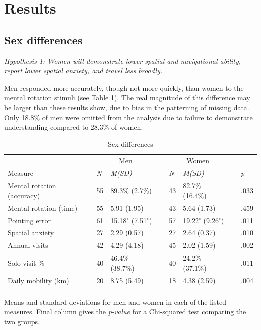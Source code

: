\section{Results}
\label{sec:3}
	\subsection{Sex differences}
	\label{sec:3.1}
	
\emph{Hypothesis 1: Women will demonstrate lower spatial and navigational ability, report lower spatial anxiety, and travel less broadly.}	
\smallskip

Men responded more accurately, though not more quickly, than women to the mental rotation stimuli (see Table \ref{tab:sex}).  The real magnitude of this difference may be larger than these results show, due to bias in the patterning of missing data.  Only 18.8\% of men were omitted from the analysis due to failure to demonstrate understanding compared to 28.3\% of women.

\begin{table}[h!]
\caption{Sex differences}
\label{tab:sex}  
\begin{tabular}{llllllll}
\hline\noalign{\smallskip}
& \multicolumn{2}{c}{Men} && \multicolumn{2}{c}{Women} && \\
Measure & \emph{N} & \emph{M(SD)} && \emph{N} & \emph{M(SD)} && \emph{p} \\
\noalign{\smallskip}\hline\noalign{\smallskip}
Mental rotation (accuracy) & 55 & 89.3\% (2.7\%) && 43 & 82.7\% (16.4\%) && .033 \\
Mental rotation (time) & 55 & 5.91 (1.95) && 43 & 5.64 (1.73) && .459 \\
Pointing error & 61 & 15.18$^{\circ}$ (7.51$^{\circ}$) && 57 & 19.22$^{\circ}$ (9.26$^{\circ}$) && .011 \\
Spatial anxiety & 27 & 2.29 (0.57) && 27 & 2.64 (0.37) && .010 \\
Annual visits & 42 & 4.29 (4.18) && 45 & 2.02 (1.59) && .002 \\
Solo visit \% & 40 & 46.4\% (38.7\%) && 40 & 24.2\% (37.1\%) && .011 \\
Daily mobility (km) & 20 & 8.75 (5.49) && 18 & 4.38 (2.59) && .004 \\
\noalign{\smallskip}\hline
\end{tabular}\par
\bigskip
Means and standard deviations for men and women in each of the listed measures. Final column gives the \emph{p-value} for a Chi-squared test comparing the two groups. 
\end{table}		  

